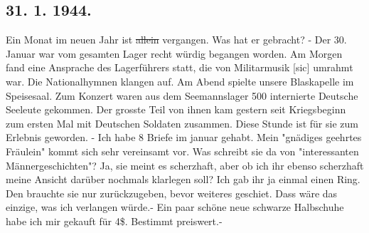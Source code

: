 \subsection{31. 1. 1944.}

Ein Monat im neuen Jahr ist \st{allein} vergangen.
Was hat er gebracht?
- Der 30. Januar war vom gesamten Lager recht w\"{u}rdig begangen worden.
Am Morgen fand eine Ansprache des Lagerf\"{u}hrers statt, die von Militarmusik{\color{red} [sic] } umrahmt war.
Die Nationalhymnen klangen auf.
Am Abend spielte unsere Blaskapelle im Speisesaal.
Zum Konzert waren aus dem Seemannslager 500 internierte Deutsche Seeleute gekommen.
Der grosste Teil von ihnen kam gestern seit Kriegsbeginn zum ersten Mal mit Deutschen Soldaten zusammen.
Diese Stunde ist f\"{u}r sie zum Erlebnis geworden.
- Ich habe 8 Briefe im januar gehabt.
Mein "gn\"{a}diges geehrtes Fr\"{a}ulein" kommt sich sehr vereinsamt vor.
Was schreibt sie da von "interessanten M\"{a}nnergeschichten"?
Ja, sie meint es scherzhaft, aber ob ich ihr ebenso scherzhaft meine Ansicht dar\"{u}ber nochmals klarlegen soll?
Ich gab ihr ja einmal einen Ring.
Den brauchte sie nur zur\"{u}ckzugeben, bevor weiteres geschiet.
Dass w\"{a}re das einzige, was ich verlangen w\"{u}rde.-
Ein paar sch\"{o}ne neue schwarze Halbschuhe habe ich mir gekauft f\"{u}r 4{\$}.
Bestimmt preiswert.-

\clearpage
